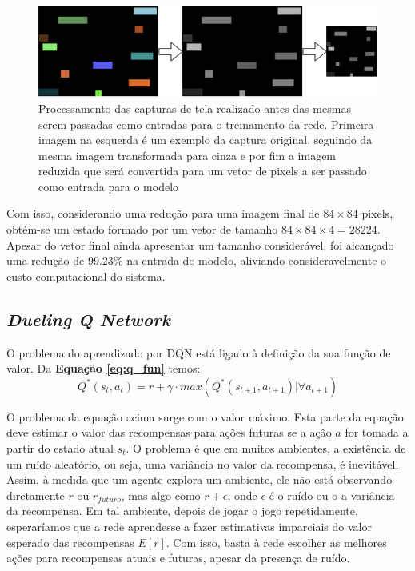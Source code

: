 \begin{figure}[h]
  \centering
  \includegraphics[width=.9 \textwidth]{conteudo/imgs/reducao_imgs.png}
  \caption[Processamento de Imagens]{Processamento das capturas de tela realizado antes das mesmas serem passadas como entradas para o treinamento da rede. Primeira imagem na esquerda é um exemplo da captura original, seguindo da mesma imagem transformada para cinza e por fim a imagem reduzida que será convertida para um vetor de pixels a ser passado como entrada para o modelo}
  \label{fig:pross_imgs}
\end{figure} 

Com isso, considerando uma redução para uma imagem final de $84\times84$ pixels, obtém-se um estado formado por um vetor de tamanho $84\times84\times4=28224$. Apesar do vetor final ainda apresentar um tamanho considerável, foi alcançado uma redução de $99.23\%$ na entrada do modelo, aliviando consideravelmente o custo computacional do sistema.


\subsection{\textit{Dueling Q Network}} %
\label{sub:rede_neural_dupla}

O problema do aprendizado por DQN está ligado à definição da sua função de valor. Da \textbf{Equação \ref{eq:q_fun}} temos:
$$Q^{*}(s_t, a_t)= r + \gamma \cdot max(Q^{*}(s_{t+1},a_{t+1})|\forall a_{t+1})$$

O problema da equação acima surge com o valor máximo. Esta parte da equação deve estimar o valor das recompensas para ações futuras se a ação $a$ for tomada a partir do estado atual $s_t$. O problema é que em muitos ambientes, a existência de um ruído aleatório, ou seja, uma variância no valor da recompensa, é inevitável. Assim, à medida que um agente explora um ambiente, ele não está observando diretamente $r$ ou $r_{futuro}$, mas algo como $r + \epsilon$, onde $\epsilon$ é o ruído ou o a variância da recompensa. Em tal ambiente, depois de jogar o jogo repetidamente, esperaríamos que a rede aprendesse a fazer estimativas imparciais do valor esperado das recompensas $E[r]$. Com isso, basta à rede escolher as melhores ações para recompensas atuais e futuras, apesar da presença de ruído.

